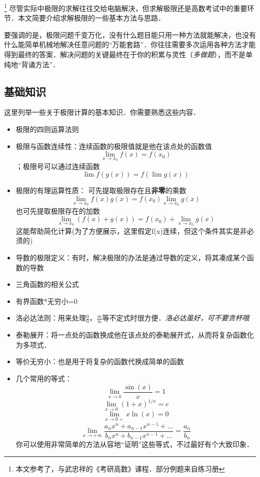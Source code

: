
\begin{issues}
\issueDraft
\end{issues}
\footnote{本文参考了\cite{同济高}，\cite{Thomas}与武忠祥的《考研高数》课程．部分例题来自练习册}
尽管实际中极限的求解往往交给电脑解决，但求解极限还是高数考试中的重要环节．本文简要介绍求解极限的一些基本方法与思路．

要强调的是，极限问题千变万化，没有什么题目能只用一种方法就能解决，也没有什么能简单机械地解决任意问题的“万能套路”．你往往需要多次运用各种方法才能得到最终的答案．解决问题的关键最终在于你的积累与灵性（\textsl{多做题}），而不是单纯地“背诵方法”．

\subsection{基础知识}
这里列举一些关于极限计算的基本知识．你需要熟悉这些内容．
\begin{itemize}
\item 极限的四则运算法则
\item 极限与函数连续性：连续函数的极限值就是他在该点处的函数值$$\lim _{x \to x_0}f(x) = f(x_0)$$；极限号可以通过连续函数 $$\lim f(g(x)) = f(\lim g(x))$$
\item 极限的有理运算性质：
可先提取极限存在且\textbf{非零}的乘数 
$$\lim_{x\to x_0} f(x)g(x) = f(x_0)\lim_{x\to x_0} g(x)$$
也可先提取极限存在的加数
$$\lim_{x\to x_0} (f(x)+g(x)) = f(x_0)+\lim_{x\to x_0} g(x)$$
这能帮助简化计算(为了方便展示，这里假定f(x)连续，但这个条件其实是非必须的)
\item 导数的极限定义：有时，解决极限的办法是通过导数的定义，将其凑成某个函数的导数
\item 三角函数的相关公式
\item 有界函数*无穷小=0
\item 洛必达法则：用来处理$\frac{0}{0}$，$\frac{\infty}{\infty}$等不定式时很方便．\textsl{洛必达虽好，可不要贪杯哦}
\item 泰勒展开：将一点处的函数换成他在该点处的泰勒展开式，从而将复杂函数化为多项式．
\item 等价无穷小：也是用于将复杂的函数代换成简单的函数
\item 几个常用的等式：
$$\lim_{x\to0} \frac{\sin(x)}{x}=1$$
$$\lim_{x\to0} (1+x)^{1/x}=e$$
$$\lim_{x\to0+} x\ln(x)=0$$
$$\lim_{x\to+\infty} \frac{a_nx^n+a_{n-1}x^{n-1}+...}{b_nx^n+b_{n-1}x^{n-1}+...}=\frac{a_n}{b_n}$$
你可以使用非常简单的方法从容地“证明”这些等式，不过最好有个大致印象．
\end{itemize}

